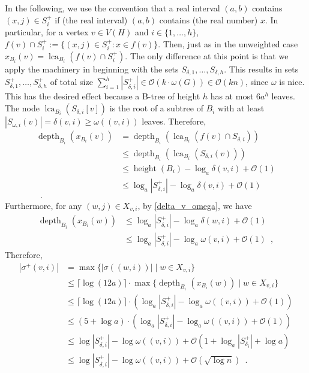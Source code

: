 \documentclass{patmorin}
\let\eqref\cref
\renewcommand{\ge}{\geqslant}
\renewcommand{\le}{\leqslant}
\DeclareMathOperator{\height}{height}
\DeclareMathOperator{\depth}{depth}
\DeclareMathOperator{\lca}{lca}
\newcommand{\Oh}{\mathcal{O}}
\begin{document}
  In the following, we use the convention that a real interval $(a,b)$ contains $(x,j)\in S^+_i$ if (the real interval) $(a,b)$ contains (the real number) $x$. In particular, for a vertex $v\in V(H)$ and $i\in\{1,\ldots,h\}$, $f(v)\cap S^+_i:=\{(x,j)\in S^+_i:x\in f(v)\}$. Then, just as in the unweighted case $x_{B_i}(v)=\lca_{B_i}(f(v)\cap S^+_i)$.  The only difference at this point is that we apply the machinery in \cite{gawrychowski.janczewski:simpler,dujmovic.esperet.ea:adjacency} beginning with the sets $S_{\delta,1},\ldots,S_{\delta,h}$.
  This results in sets $S^+_{\delta,1},\ldots,S^+_{\delta,h}$ of total size $\sum_{i=1}^h |S^+_{\delta,i}|\in \Oh(k\cdot\omega(G))\in \Oh(kn)$, since $\omega$ is nice.
  This has the desired effect because a B-tree of height $h$ has at most $6a^h$ leaves.
  The node $\lca_{B_i}(S_{\delta,i}[v])$ is the root of a subtree of $B_i$ with at least $|S_{\omega,i}(v)|=\delta(v,i)\ge\omega((v,i))$ leaves.
  Therefore,
  \begin{align*}
     \depth_{B_i}(x_{B_i}(v))
     & =
     \depth_{B_i}(\lca_{B_i}(f(v)\cap S_{\delta,i})) \\
     & \le
     \depth_{B_i}(\lca_{B_i}(S_{\delta,i}(v))) \\
     & \le\height(B_i)-\log_a\delta(v,i) + \Oh(1) \\
     & \le \log_a|S^+_{\delta,i}| - \log_a\delta(v,i) + \Oh(1) \\
    \enspace .
  \end{align*}
  Furthermore, for any $(w,j)\in X_{v,i}$, by \eqref{delta_v_omega}, we have
  \begin{align*}
    \depth_{B_i}(x_{B_i}(w))
      & \le \log_a|S^+_{\delta,i}| - \log_a\delta(w,i) + \Oh(1) \\
      & \le \log_a|S^+_{\delta,i}| - \log_a\omega(v,i) + \Oh(1) \enspace ,
  \end{align*}
  Therefore,
  \begin{align*}
     |\sigma^+(v,i)|
      & = \max\{|\sigma((w,i))| \mid w\in X_{v,i}\} \\
      & \le \lceil \log (12a)\rceil\cdot\max\{\depth_{B_i}(x_{B_i}(w)) \mid w\in X_{v,i}\} \\
      & \le \lceil \log (12a)\rceil\cdot (\log_a|S^+_{\delta,i}| - \log_a\omega((v,i)) + \Oh(1)) \\
      & \le (5+ \log a)\cdot (\log_a|S^+_{\delta,i}| - \log_a\omega((v,i)) + \Oh(1)) \\
      & \le \log |S^+_{\delta,i}| - \log\omega((v,i)) + \Oh(1+\log_a |S^+_{\delta_i}| + \log a) \\
      & \le \log |S^+_{\delta,i}| - \log\omega((v,i)) + \Oh(\sqrt{\log n})
      \enspace .
  \end{align*}
\end{document}
